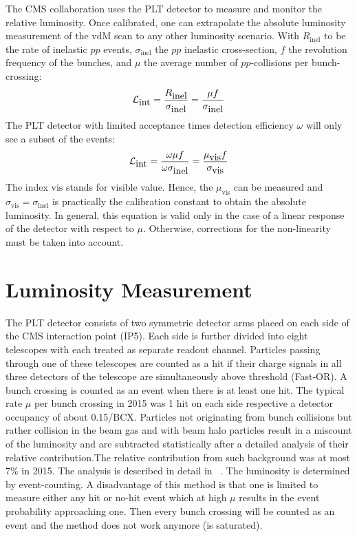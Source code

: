 The CMS collaboration uses the PLT detector to measure and monitor the relative luminosity. 
Once calibrated, one can extrapolate the absolute luminosity measurement of the 
vdM scan to any other luminosity scenario. With $R_{\mbox{inel}}$ to be the rate of inelastic 
$pp$ events, $\sigma_{\mbox{inel}}$ the $pp$ inelastic cross-section, $f$ the revolution frequency 
of the bunches, and $\mu$ the average number of $pp$-collisions per bunch-crossing:
\begin{equation}
{\cal L}_{\mbox{int}} = \frac{R_{\mbox{inel}}}{\sigma_{\mbox{inel}}} = \frac{\mu f}{\sigma_{\mbox{inel}}}
\end{equation}
The PLT detector with limited acceptance times detection efficiency $\omega$ will only see a subset of the events:
\begin{equation}
{\cal L}_{\mbox{int}} = \frac{\omega \mu f}{\omega \sigma_{\mbox{inel}}} = \frac{\mu_{\mbox{vis}} f}{\sigma_{\mbox{vis}}}
\end{equation}
The index $\mbox{vis}$ stands for visible value. Hence, the $\mu_{\mbox{vis}}$ can be measured and
${\sigma_{\mbox{vis}}} = {\sigma_{\mbox{inel}}}$ is practically the calibration constant to obtain the absolute luminosity.
In general, this equation is valid only in the case of a linear response of the detector with 
respect to $\mu$. Otherwise, corrections for the non-linearity must be taken into account.


\section {Luminosity Measurement} \label{sec:lumiMeasurement}
The PLT detector consists of two symmetric detector arms placed on each side of the CMS interaction point (IP5).
Each side is further divided into eight telescopes with each treated as separate readout channel. Particles passing
through one of these telescopes are counted as a hit if their charge signals in all three detectors of the
telescope are simultaneously above threshold (Fast-OR). A bunch crossing is counted as an event when there is at least 
one hit. The typical rate $\mu$ per bunch crossing in 2015 was 1 hit on each side respective
a detector occupancy of about 0.15/BCX. Particles not originating from bunch collisions but rather
collision in the beam gas and with beam halo particles result in a miscount of the luminosity and
are subtracted statistically after a detailed analysis of their relative contribution.The relative
contribution from such background was at most 7\% in 2015. The analysis is described in detail in ~\cite{PLT:AN-16-002_v3}.
The luminosity is determined by event-counting. A disadvantage of this method is that one is
limited to measure either any hit or no-hit event which at high $\mu$ results in the event probability
approaching one. Then every bunch crossing will be counted as an event and the method does
not work anymore (is saturated). 

